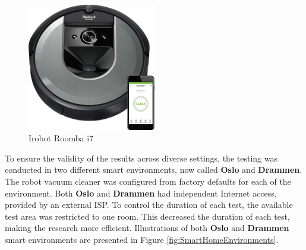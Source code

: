 \begin{figure}[H]
    \centering
    \includegraphics[width=0.5\textwidth]{figures/Irobot_picture.png}
    \caption{Irobot Roomba i7 \cite{irobotroombai7_picture}}
    \label{fig:irobotroombai7}
\end{figure}

To ensure the validity of the results across diverse settings, the testing was conducted in two different smart environments, now called \textbf{Oslo} and \textbf{Drammen}. The robot vacuum cleaner was configured from factory defaults for each of the environment. Both \textbf{Oslo} and \textbf{Drammen} had independent Internet access, provided by an external \gls{ISP}. To control the duration of each test, the available test area was restricted to one room. This decreased the duration of each test, making the research more efficient. Illustrations of both \textbf{Oslo} and \textbf{Drammen} smart environments are presented in Figure \ref{fig:SmartHomeEnvironments}.

